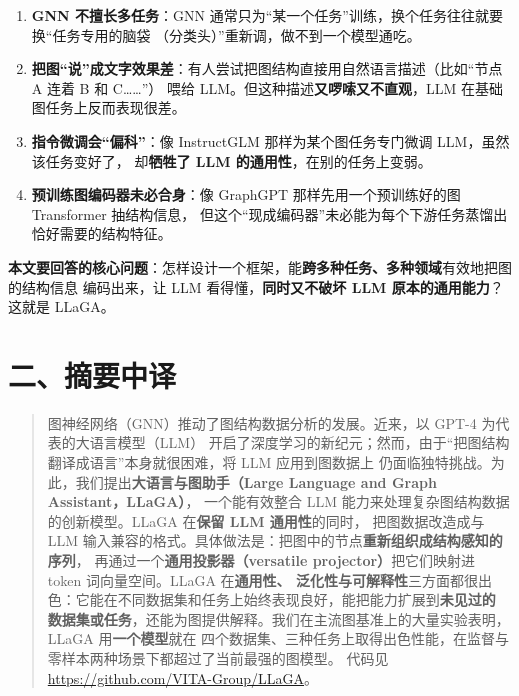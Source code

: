 \documentclass[11pt,UTF8,fontset=fandol]{ctexart}
\begin{document}
\begin{enumerate}[leftmargin=2em]
  \item \textbf{GNN 不擅长多任务}：GNN 通常只为“某一个任务”训练，换个任务往往就要换“任务专用的脑袋
        （分类头）”重新调，做不到一个模型通吃。
  \item \textbf{把图“说”成文字效果差}：有人尝试把图结构直接用自然语言描述（比如“节点 A 连着 B 和 C……”）
        喂给 LLM。但这种描述\textbf{又啰嗦又不直观}，LLM 在基础图任务上反而表现很差。
  \item \textbf{指令微调会“偏科”}：像 InstructGLM 那样为某个图任务专门微调 LLM，虽然该任务变好了，
        却\textbf{牺牲了 LLM 的通用性}，在别的任务上变弱。
  \item \textbf{预训练图编码器未必合身}：像 GraphGPT 那样先用一个预训练好的图 Transformer 抽结构信息，
        但这个“现成编码器”未必能为每个下游任务蒸馏出恰好需要的结构特征。
\end{enumerate}

\textbf{本文要回答的核心问题}：怎样设计一个框架，能\textbf{跨多种任务、多种领域}有效地把图的结构信息
编码出来，让 LLM 看得懂，\textbf{同时又不破坏 LLM 原本的通用能力}？这就是 LLaGA。

\section{二、摘要中译}

\begin{quote}
图神经网络（GNN）推动了图结构数据分析的发展。近来，以 GPT-4 为代表的大语言模型（LLM）
开启了深度学习的新纪元；然而，由于“把图结构翻译成语言”本身就很困难，将 LLM 应用到图数据上
仍面临独特挑战。为此，我们提出\textbf{大语言与图助手（Large Language and Graph Assistant，LLaGA）}，
一个能有效整合 LLM 能力来处理复杂图结构数据的创新模型。LLaGA 在\textbf{保留 LLM 通用性}的同时，
把图数据改造成与 LLM 输入兼容的格式。具体做法是：把图中的节点\textbf{重新组织成结构感知的序列}，
再通过一个\textbf{通用投影器（versatile projector）}把它们映射进 token 词向量空间。LLaGA 在\textbf{通用性、
泛化性与可解释性}三方面都很出色：它能在不同数据集和任务上始终表现良好，能把能力扩展到\textbf{未见过的
数据集或任务}，还能为图提供解释。我们在主流图基准上的大量实验表明，LLaGA 用\textbf{一个模型}就在
四个数据集、三种任务上取得出色性能，在监督与零样本两种场景下都超过了当前最强的图模型。
代码见 \url{https://github.com/VITA-Group/LLaGA}。
\end{quote}
\end{document}
